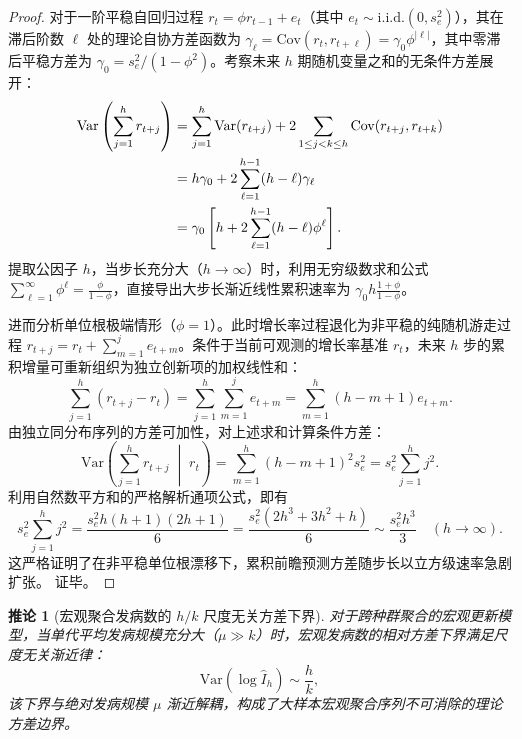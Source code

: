 \documentclass[11pt,a4paper]{article}
\theoremstyle{plain}
\newtheorem{corollary}{推论}
\theoremstyle{definition}
\begin{document}
\begin{proof}
对于一阶平稳自回归过程 $r_t = \phi r_{t-1} + e_t$（其中 $e_t \sim \text{i.i.d.}(0, s_e^2)$），其在滞后阶数 $\ell$ 处的理论自协方差函数为 $\gamma_\ell = \text{Cov}(r_t, r_{t+\ell}) = \gamma_0 \phi^{|\ell|}$，其中零滞后平稳方差为 $\gamma_0 = s_e^2/(1-\phi^2)$。考察未来 $h$ 期随机变量之和的无条件方差展开：
\begin{align}
\text{Var}\left(\sum_{j=1}^h r_{t+j}\right) &= \sum_{j=1}^h \text{Var}(r_{t+j}) + 2 \sum_{1 \le j < k \le h} \text{Cov}(r_{t+j}, r_{t+k}) \notag \\
&= h \gamma_0 + 2 \sum_{\ell=1}^{h-1} (h - \ell) \gamma_\ell \notag \\
&= \gamma_0 \left[ h + 2 \sum_{\ell=1}^{h-1} (h-\ell) \phi^\ell \right].
\end{align}
提取公因子 $h$，当步长充分大（$h \to \infty$）时，利用无穷级数求和公式 $\sum_{\ell=1}^\infty \phi^\ell = \frac{\phi}{1-\phi}$，直接导出大步长渐近线性累积速率为 $\gamma_0 h \frac{1+\phi}{1-\phi}$。

进而分析单位根极端情形（$\phi = 1$）。此时增长率过程退化为非平稳的纯随机游走过程 $r_{t+j} = r_t + \sum_{m=1}^j e_{t+m}$。条件于当前可观测的增长率基准 $r_t$，未来 $h$ 步的累积增量可重新组织为独立创新项的加权线性和：
\begin{equation}
\sum_{j=1}^h (r_{t+j} - r_t) = \sum_{j=1}^h \sum_{m=1}^j e_{t+m} = \sum_{m=1}^h (h - m + 1) e_{t+m}.
\end{equation}
由独立同分布序列的方差可加性，对上述求和计算条件方差：
\begin{equation}
\text{Var}\left(\sum_{j=1}^h r_{t+j} \;\middle|\; r_t\right) = \sum_{m=1}^h (h - m + 1)^2 s_e^2 = s_e^2 \sum_{j=1}^h j^2.
\end{equation}
利用自然数平方和的严格解析通项公式，即有
\begin{equation}
s_e^2 \sum_{j=1}^h j^2 = \frac{s_e^2 h(h+1)(2h+1)}{6} = \frac{s_e^2 (2h^3 + 3h^2 + h)}{6} \sim \frac{s_e^2 h^3}{3} \quad (h \to \infty).
\end{equation}
这严格证明了在非平稳单位根漂移下，累积前瞻预测方差随步长以立方级速率急剧扩张。
证毕。
\end{proof}

\begin{corollary}[宏观聚合发病数的 $h/k$ 尺度无关方差下界]\label{cor:pop_floor}
对于跨种群聚合的宏观更新模型，当单代平均发病规模充分大（$\mu \gg k$）时，宏观发病数的相对方差下界满足尺度无关渐近律：
\begin{equation}
\text{Var}(\log \hat{I}_h) \sim \frac{h}{k},
\label{eq:pop_floor}
\end{equation}
该下界与绝对发病规模 $\mu$ 渐近解耦，构成了大样本宏观聚合序列不可消除的理论方差边界。
\end{corollary}
\end{document}
